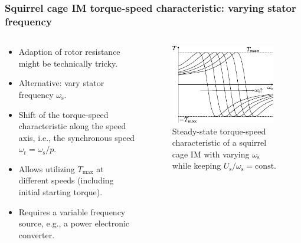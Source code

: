 \begin{frame}
	\frametitle{Squirrel cage IM torque-speed characteristic: varying stator frequency}
    \begin{columns}
		\begin{column}{0.5\textwidth}
	      \begin{itemize}
            \item Adaption of rotor resistance might be technically tricky. 
            \item Alternative: vary stator frequency $\omega_\mathrm{s}$.
            \item Shift of the torque-speed characteristic along the speed axis, i.e., the synchronous speed $\omega_\mathrm{r}=\omega_\mathrm{s}/p$.
            \item Allows utilizing $T_\mathrm{max}$ at different speeds (including initial starting torque).
            \item Requires a variable frequency source, e.g., a power electronic converter.
          \end{itemize}
        \end{column}
        \begin{column}{0.5\textwidth}
            \begin{figure}
                \centering
                \includegraphics[width=0.95\textwidth]{fig/lec06/Kloss_formula_different_excitation_frequencies.pdf}
                \caption{Steady-state torque-speed characteristic of a squirrel cage IM with varying $\omega_\mathrm{s}$ while keeping $U_\mathrm{s}/\omega_\mathrm{s}=\mathrm{const.}$}
                \label{fig:Kloss_formula_different_excitation_frequencies}
            \end{figure}
        \end{column}
    \end{columns}
\end{frame}

